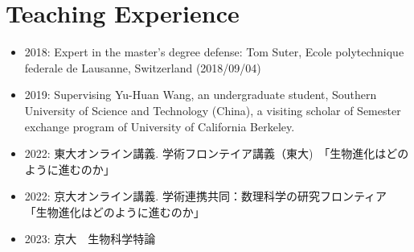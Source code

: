 \documentclass[letterpaper,12pt]{article}
\begin{document}
 \section*{{\bf Teaching Experience}}
 \begin{itemize}
 \item  2018: Expert in the master's degree defense: Tom Suter, Ecole polytechnique federale de Lausanne, Switzerland (2018/09/04)

 \item  2019: Supervising Yu-Huan Wang, an undergraduate student, Southern University of Science and Technology (China), a visiting scholar of Semester exchange program of University of California Berkeley.

  \item  2022: 東大オンライン講義. 学術フロンテイア講義（東大)　「生物進化はどのように進むのか」
  \item 2022: 京大オンライン講義. 学術連携共同：数理科学の研究フロンティア　「生物進化はどのように進むのか」
  \item 2023: 京大　生物科学特論
   \end{itemize}
%
%
%
\end{document}
